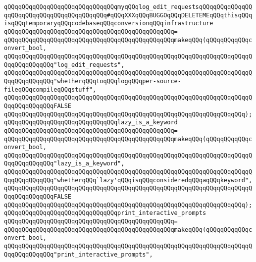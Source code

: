 \verb|qQQqqQQqqQQqqQQqqQQqqQQqqQQqqQQqmyqQQqlog_edit_requestsqQQqqQQqqQQqqQQqqQQqqQQqqQQqqQQqqQQqqQQqqQQq#qQQqXXXqQQqBUGGOqQQqDELETEMEqQQqthisqQQqisqQQqtemporaryqQQqcodebaseqQQqconversionqQQqinfrastructure|\newline
\verb|qQQqqQQqqQQqqQQqqQQqqQQqqQQqqQQqqQQqqQQqqQQqqQQq=|\newline
\verb|qQQqqQQqqQQqqQQqqQQqqQQqqQQqqQQqqQQqqQQqqQQqqQQqmakeqQQq(qQQqqQQqqQQqconvert_bool,|\newline
\verb|qQQqqQQqqQQqqQQqqQQqqQQqqQQqqQQqqQQqqQQqqQQqqQQqqQQqqQQqqQQqqQQqqQQqqQQqqQQqqQQqqQQq"log_edit_requests",|\newline
\verb|qQQqqQQqqQQqqQQqqQQqqQQqqQQqqQQqqQQqqQQqqQQqqQQqqQQqqQQqqQQqqQQqqQQqqQQqqQQqqQQqqQQq"whetherqQQqtoqQQqlogqQQqper-source-fileqQQqcompileqQQqstuff",|\newline
\verb|qQQqqQQqqQQqqQQqqQQqqQQqqQQqqQQqqQQqqQQqqQQqqQQqqQQqqQQqqQQqqQQqqQQqqQQqqQQqqQQqqQQqFALSE|\newline
\verb|qQQqqQQqqQQqqQQqqQQqqQQqqQQqqQQqqQQqqQQqqQQqqQQqqQQqqQQqqQQqqQQqqQQq);|\newline
\newline
\verb|qQQqqQQqqQQqqQQqqQQqqQQqqQQqqQQqlazy_is_a_keyword|\newline
\verb|qQQqqQQqqQQqqQQqqQQqqQQqqQQqqQQqqQQqqQQqqQQqqQQq=|\newline
\verb|qQQqqQQqqQQqqQQqqQQqqQQqqQQqqQQqqQQqqQQqqQQqqQQqmakeqQQq(qQQqqQQqqQQqconvert_bool,|\newline
\verb|qQQqqQQqqQQqqQQqqQQqqQQqqQQqqQQqqQQqqQQqqQQqqQQqqQQqqQQqqQQqqQQqqQQqqQQqqQQqqQQqqQQq"lazy_is_a_keyword",|\newline
\verb|qQQqqQQqqQQqqQQqqQQqqQQqqQQqqQQqqQQqqQQqqQQqqQQqqQQqqQQqqQQqqQQqqQQqqQQqqQQqqQQqqQQq"whetherqQQq`lazy'qQQqisqQQqconsideredqQQqaqQQqkeyword",|\newline
\verb|qQQqqQQqqQQqqQQqqQQqqQQqqQQqqQQqqQQqqQQqqQQqqQQqqQQqqQQqqQQqqQQqqQQqqQQqqQQqqQQqqQQqFALSE|\newline
\verb|qQQqqQQqqQQqqQQqqQQqqQQqqQQqqQQqqQQqqQQqqQQqqQQqqQQqqQQqqQQqqQQqqQQq);|\newline
\newline
\verb|qQQqqQQqqQQqqQQqqQQqqQQqqQQqqQQqprint_interactive_prompts|\newline
\verb|qQQqqQQqqQQqqQQqqQQqqQQqqQQqqQQqqQQqqQQqqQQqqQQq=|\newline
\verb|qQQqqQQqqQQqqQQqqQQqqQQqqQQqqQQqqQQqqQQqqQQqqQQqmakeqQQq(qQQqqQQqqQQqconvert_bool,|\newline
\verb|qQQqqQQqqQQqqQQqqQQqqQQqqQQqqQQqqQQqqQQqqQQqqQQqqQQqqQQqqQQqqQQqqQQqqQQqqQQqqQQqqQQq"print_interactive_prompts",|\newline
